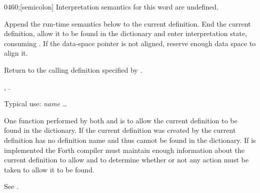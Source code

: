 \begin{worddef}{0460}{;}[semicolon]
\interpret
	Interpretation semantics for this word are undefined.

\compile

	Append the run-time semantics below to the current definition. End
	the current definition, allow it to be found in the dictionary and
	enter interpretation state, consuming . If the
	data-space pointer is not aligned, reserve enough data space to
	align it.

\runtime
	\stack{}{}

	Return to the calling definition specified by .

\see {},
	.

	\begin{defer}
	\rationale %
		Typical use:
			\word{:} \emph{name} {\ldots} \word{;}

		One function performed by both \word{;} and 
		is to allow the current definition to be found in the
		dictionary. If the current definition was created by
		 the current definition has no definition name
		and thus cannot be found in the dictionary. If 
		is implemented the Forth compiler must maintain enough
		information about the current definition to allow \word{;} and
		 to determine whether or not any action must
		be taken to allow it to be found.

	\testing\rmfamily
		See .
	\end{defer}
\end{worddef}


